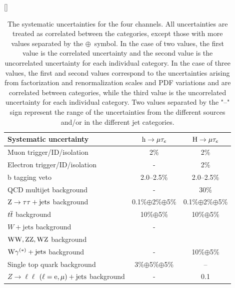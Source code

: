 \begin{table}[htpb]
  \begin{center}
    \caption{The systematic uncertainties for the four channels. All uncertainties are treated as correlated between the categories, except those with more values separated by the $\oplus$~symbol. In the case of two values, the first value is the correlated uncertainty and the second value is the uncorrelated uncertainty for each individual category. In the case of three values, the first and second values correspond to the uncertainties arising from factorization and renormalization scales and PDF variations and are correlated between categories, while the third value is the uncorrelated uncertainty for each individual category. Two values separated by the "--" sign represent the range of the uncertainties from the different sources and/or in the different jet categories. %
    }
    [\cmsTabSkip]
\begin{tabular}{l*{2}{c}} \hline
Systematic  uncertainty            & $\text{h} \to \mu \tau_{e}$& $\text{H} \to \mu \tau_{e}$  \\ \hline
Muon  trigger/ID/isolation         &       2\%             &       2\%         \\
Electron trigger/ID/isolation      &       -             &       2\%           \\
b tagging veto                     &      2.0--2.5\%       &      2.0--2.5\%         \\ 
[\cmsTabSkip]
QCD multijet background            &      -              &       30\%                \\
$\text{Z} \to \tau \tau+\textrm{jets}$ background &     0.1\%$\oplus$2\%$\oplus$5\%   & 0.1\%$\oplus$2\%$\oplus$5\%         \\
$t\overline{t}$ background                &     10\%$\oplus$5\%   &   10\%$\oplus$5\%              \\
$W+\textrm{jets}$ background     &     -               &                  \\
$\text{W}\text{W},\text{Z}\text{Z},\text{W}\text{Z}$ background&                  &\\
$\text{W}\gamma^{(*)}+\text{jets}$ background           &     -               &   10\%$\oplus$5\%            \\
Single top quark background        &     3\%$\oplus$5\%$\oplus$5\%    &   --              \\ 
$Z\to\ell\ell$ $(\ell = \text{e}, \mu)+\text{jets}$ background&     -               & 0.1          \\

\end{tabular}
\end{center}
\end{table}
